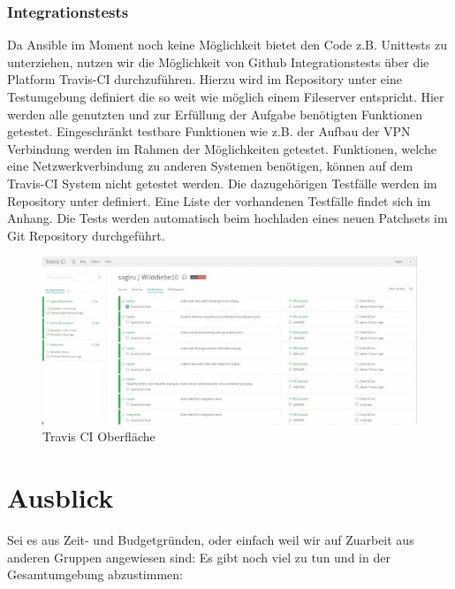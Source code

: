 \subsubsection{Integrationstests}
Da Ansible im Moment noch keine Möglichkeit bietet den Code z.B. Unittests zu unterziehen, nutzen wir die Möglichkeit von Github Integrationstests über die Platform Travis-CI durchzuführen. Hierzu wird im Repository unter \newline  {} eine Testumgebung definiert die so weit wie möglich einem Fileserver entspricht. Hier werden alle genutzten und zur Erfüllung der Aufgabe benötigten Funktionen getestet. Eingeschränkt testbare Funktionen wie z.B. der Aufbau der VPN Verbindung werden im Rahmen der Möglichkeiten getestet. Funktionen, welche eine Netzwerkverbindung zu anderen Systemen benötigen, können auf dem Travis-CI System nicht getestet werden. Die dazugehörigen Testfälle werden im Repository unter  definiert. Eine Liste der vorhandenen Testfälle findet sich im Anhang. Die Tests werden automatisch beim hochladen eines neuen Patchsets im Git Repository durchgeführt.

\begin{figure}[!htbp]
	\centering
		\includegraphics[scale=0.75]{images/travisci.jpg} 
	\caption{Travis CI Oberfläche}
	\label{img:travisci}
\end{figure}


\section{Ausblick}
\label{sec:ausblick}
Sei es aus Zeit- und Budgetgründen, oder einfach weil wir auf Zuarbeit aus anderen Gruppen angewiesen sind: Es gibt noch viel zu tun und in der Gesamtumgebung abzustimmen:
